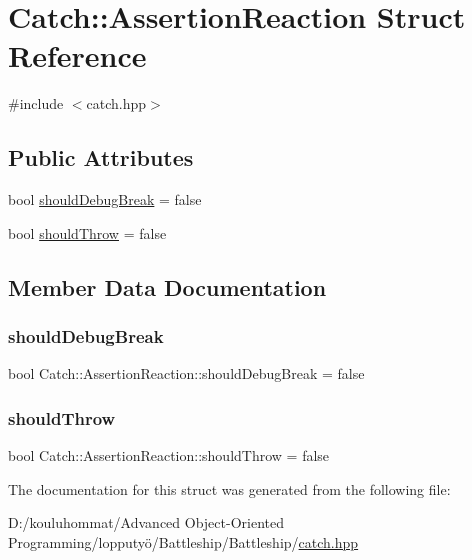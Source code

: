\hypertarget{struct_catch_1_1_assertion_reaction}{}\section{Catch\+:\+:Assertion\+Reaction Struct Reference}
\label{struct_catch_1_1_assertion_reaction}


{\ttfamily \#include $<$catch.\+hpp$>$}

\subsection*{Public Attributes}
\begin{DoxyCompactItemize}
\item 
bool \mbox{\hyperlink{struct_catch_1_1_assertion_reaction_adcf30fb90ff20d9789df78d424652497}{should\+Debug\+Break}} = false
\item 
bool \mbox{\hyperlink{struct_catch_1_1_assertion_reaction_a82c8d95a2c1b6a331bde66982a8e090f}{should\+Throw}} = false
\end{DoxyCompactItemize}


\subsection{Member Data Documentation}
\mbox{\label{struct_catch_1_1_assertion_reaction_adcf30fb90ff20d9789df78d424652497}} 
\subsubsection{\texorpdfstring{should\+Debug\+Break}{shouldDebugBreak}}
{\footnotesize\ttfamily bool Catch\+::\+Assertion\+Reaction\+::should\+Debug\+Break = false}

\mbox{\label{struct_catch_1_1_assertion_reaction_a82c8d95a2c1b6a331bde66982a8e090f}} 
\subsubsection{\texorpdfstring{should\+Throw}{shouldThrow}}
{\footnotesize\ttfamily bool Catch\+::\+Assertion\+Reaction\+::should\+Throw = false}



The documentation for this struct was generated from the following file\+:\begin{DoxyCompactItemize}
\item 
D\+:/kouluhommat/\+Advanced Object-\/\+Oriented Programming/lopputyö/\+Battleship/\+Battleship/\mbox{\hyperlink{catch_8hpp}{catch.\+hpp}}\end{DoxyCompactItemize}
